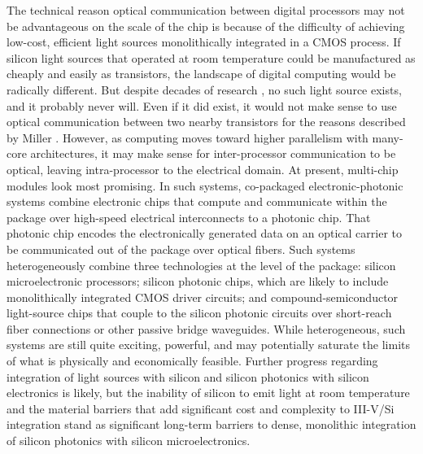 The technical reason optical communication between digital processors may not be advantageous on the scale of the chip is because of the difficulty of achieving low-cost, efficient light sources monolithically integrated in a CMOS process. If silicon light sources that operated at room temperature could be manufactured as cheaply and easily as transistors, the landscape of digital computing would be radically different. But despite decades of research \cite{shxu2007}, no such light source exists, and it probably never will. Even if it did exist, it would not make sense to use optical communication between two nearby transistors for the reasons described by Miller \cite{mi2017}. However, as computing moves toward higher parallelism with many-core architectures, it may make sense for inter-processor communication to be optical, leaving intra-processor to the electrical domain. At present, multi-chip modules look most promising. In such systems, co-packaged electronic-photonic systems combine electronic chips that compute and communicate within the package over high-speed electrical interconnects to a photonic chip. That photonic chip encodes the electronically generated data on an optical carrier to be communicated out of the package over optical fibers. Such systems heterogeneously combine three technologies at the level of the package: silicon microelectronic processors; silicon photonic chips, which are likely to include monolithically integrated CMOS driver circuits; and compound-semiconductor light-source chips that couple to the silicon photonic circuits over short-reach fiber connections or other passive bridge waveguides. While heterogeneous, such systems are still quite exciting, powerful, and may potentially saturate the limits of what is physically and economically feasible. Further progress regarding integration of light sources with silicon and silicon photonics with silicon electronics is likely, but the inability of silicon to emit light at room temperature and the material barriers that add significant cost and complexity to III-V/Si integration stand as significant long-term barriers to dense, monolithic integration of silicon photonics with silicon microelectronics.

